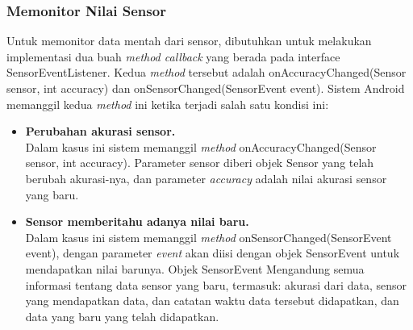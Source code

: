 \subsubsection{Memonitor Nilai Sensor}
\label{sssec:memonitor_nilai_sensor}

Untuk memonitor data mentah dari sensor, dibutuhkan untuk melakukan implementasi dua buah \textit{method callback} yang berada pada interface SensorEventListener. Kedua \textit{method} tersebut adalah onAccuracyChanged(Sensor sensor, int accuracy) dan onSensorChanged(SensorEvent event). Sistem Android memanggil kedua \textit{method} ini ketika terjadi salah satu kondisi ini:

\begin{itemize}
	\item \textbf{Perubahan akurasi sensor.}\\
Dalam kasus ini sistem memanggil \textit{method} onAccuracyChanged(Sensor sensor, int accuracy). Parameter sensor diberi objek Sensor yang telah berubah akurasi-nya, dan parameter \textit{accuracy} adalah nilai akurasi sensor yang baru.
	\item \textbf{Sensor memberitahu adanya nilai baru.}\\
Dalam kasus ini sistem memanggil \textit{method} onSensorChanged(SensorEvent event), dengan parameter \textit{event} akan diisi dengan objek SensorEvent untuk mendapatkan nilai barunya. Objek SensorEvent Mengandung semua informasi tentang data sensor yang baru, termasuk: akurasi dari data, sensor yang mendapatkan data, dan catatan waktu data tersebut didapatkan, dan data yang baru yang telah didapatkan.
\end{itemize}

